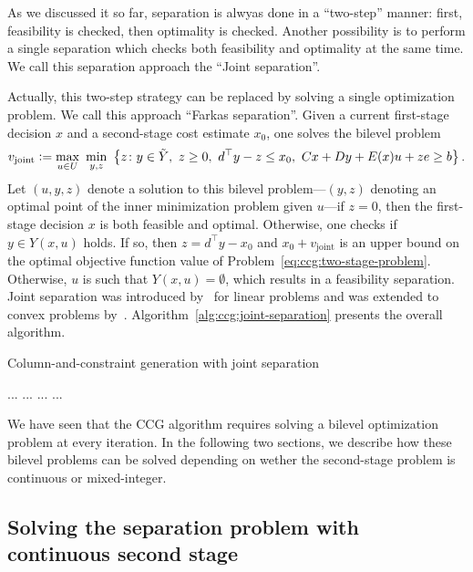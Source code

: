 As we discussed it so far, separation is alwyas done in a ``two-step'' manner:
first, feasibility is checked, then optimality is checked. Another possibility
is to perform a single separation which checks both feasibility and optimality
at the same time. We call this separation approach the ``Joint separation''. 

Actually, this
two-step strategy can be replaced by solving a single optimization problem. We
call this approach ``Farkas separation''. Given a current first-stage decision
$x$ and a second-stage cost estimate $x_0$, one solves the bilevel problem 
\begin{equation*}
    v_\text{joint} \mathrel{{\mathop:}{=}} \max_{u\in U} \ \min_{y,z} \ \left\{ z \colon y\in\tilde{Y}, \ z \ge 0, \ d^\top y - z \le x_0, \ Cx + Dy + E(x)u + ze \ge b \right\}.
\end{equation*}
Let $(u,y,z)$ denote a solution to this bilevel problem---$(y,z)$ denoting an
optimal point of the inner minimization problem given $u$---if $z = 0$, then
the first-stage decision $x$ is both feasible and optimal. Otherwise, one
checks if $y\in Y(x,u)$ holds. If so, then $z = d^\top y - x_0$ and $x_0 +
v_\text{joint}$ is an upper bound on the optimal objective function value of
Problem~\eqref{eq:ccg:two-stage-problem}. Otherwise, $u$ is such that $Y(x,u)
= \emptyset$, which results in a feasibility separation. Joint separation was
introduced by~\textcite{Ayoub2016} for linear problems and was extended to
convex problems by~\textcite{lefebvre2022convex}.
Algorithm~\ref{alg:ccg:joint-separation} presents the overall algorithm.

\begin{algorithm}
    \caption{Column-and-constraint generation with joint separation}
    \label{alg:ccg:joint-separation}
    \begin{algorithmic}[1]
        \State ...
        \While {}
        \State ...
            \State ... 
        \EndIf
        \State ...
        \EndWhile
    \end{algorithmic}
\end{algorithm}

We have seen that the CCG algorithm requires solving a bilevel optimization
problem at every iteration. In the following two sections, we describe how
these bilevel problems can be solved depending on wether the second-stage
problem is continuous or mixed-integer. 

\subsection{Solving the separation problem with continuous second stage}

